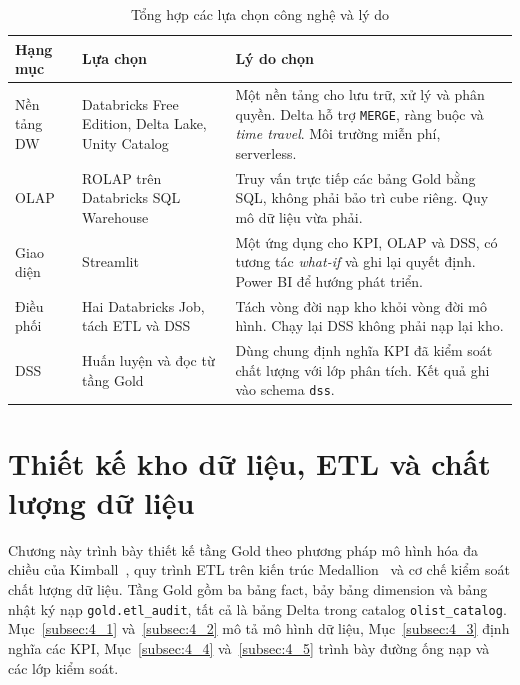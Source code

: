 \documentclass[a4paper]{article}
\begin{document}
\begin{table}[htbp]
\centering
\footnotesize
\setlength{\tabcolsep}{3pt}
\renewcommand{\arraystretch}{1.08}
\caption{Tổng hợp các lựa chọn công nghệ và lý do}
\label{tab:tech_choices}
\begin{tabularx}{\textwidth}{@{}>{\raggedright\arraybackslash}p{2.3cm}>{\raggedright\arraybackslash}X>{\raggedright\arraybackslash}X@{}}
\toprule
\textbf{Hạng mục} & \textbf{Lựa chọn} & \textbf{Lý do chọn} \\
\midrule
Nền tảng DW & Databricks Free Edition, Delta Lake, Unity Catalog & Một nền tảng cho lưu trữ, xử lý và phân quyền. Delta hỗ trợ \texttt{MERGE}, ràng buộc và \textit{time travel}. Môi trường miễn phí, serverless. \\
\addlinespace
OLAP & ROLAP trên Databricks SQL Warehouse & Truy vấn trực tiếp các bảng Gold bằng SQL, không phải bảo trì cube riêng. Quy mô dữ liệu vừa phải. \\
\addlinespace
Giao diện & Streamlit & Một ứng dụng cho KPI, OLAP và DSS, có tương tác \textit{what-if} và ghi lại quyết định. Power BI để hướng phát triển. \\
\addlinespace
Điều phối & Hai Databricks Job, tách ETL và DSS & Tách vòng đời nạp kho khỏi vòng đời mô hình. Chạy lại DSS không phải nạp lại kho. \\
\addlinespace
DSS & Huấn luyện và đọc từ tầng Gold & Dùng chung định nghĩa KPI đã kiểm soát chất lượng với lớp phân tích. Kết quả ghi vào schema \texttt{dss}. \\
\bottomrule
\end{tabularx}
\end{table}

\section{Thiết kế kho dữ liệu, ETL và chất lượng dữ liệu}
\label{sec:ch4}

Chương này trình bày thiết kế tầng Gold theo phương pháp mô hình hóa đa chiều của Kimball~\cite{bib:kimball2013}, quy trình ETL trên kiến trúc Medallion~\cite{bib:databricks} và cơ chế kiểm soát chất lượng dữ liệu. Tầng Gold gồm ba bảng fact, bảy bảng dimension và bảng nhật ký nạp \texttt{gold.etl\_audit}, tất cả là bảng Delta trong catalog \texttt{olist\_catalog}. Mục~\ref{subsec:4_1} và~\ref{subsec:4_2} mô tả mô hình dữ liệu, Mục~\ref{subsec:4_3} định nghĩa các KPI, Mục~\ref{subsec:4_4} và~\ref{subsec:4_5} trình bày đường ống nạp và các lớp kiểm soát.
\end{document}
